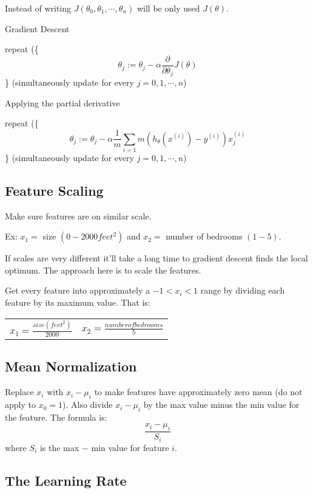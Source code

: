 \documentclass[a4paper]{article}
\begin{document}
Instead of writing $J(\theta_0, \theta_1, \cdots, \theta_n)$ will be only used $J(\theta)$.

Gradient Descent

repeat (\{
$$
\theta_j := \theta_j - \alpha \frac{\partial}{\partial \theta_j}J(\theta)
$$
\} (simultaneously update for every $j = 0, 1, \cdots, n$)

Applying the partial derivative

\medskip

repeat (\{
$$
\theta_j := \theta_j - \alpha \frac{1}{m}\sum_{i=1}{m}(h_\theta(x^{(i)})-y^{(i)})x_{j}^{(i)}
$$
\} (simultaneously update for every $j = 0, 1, \cdots, n$)

\subsection{Feature Scaling}

Make sure features are on similar scale.

Ex: $x_1 = $ size $(0-2000 feet^2)$ and $x_2 = $ number of bedrooms $(1-5)$.

If scales are very different it'll take a long time to gradient descent finds the local optimum. The approach here is to scale the features.

\medskip

Get every feature into approximately a $-1 < x_i < 1$ range by dividing each feature by its maximum value. That is:

\medskip

\begin{center}
\begin{tabular}{cc}
$x_1 = \frac{size (feet^2)}{2000}$ &
$x_2 = \frac{number of bedrooms}{5}$
\end{tabular}
\end{center}

\subsection{Mean Normalization}

Replace $x_i$ with $x_i - \mu_i$ to make features have approximately zero mean (do not apply to $x_0 = 1$). Also divide $x_i - \mu_i$ by the max value minus the min value for the feature. The formula is: $$\frac{x_i - \mu_i}{S_i}$$ where $S_i$ is the max $-$ min value for feature $i$.

\subsection{The Learning Rate}
\end{document}
